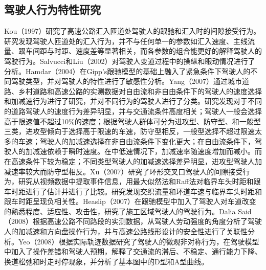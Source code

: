 \subsection{驾驶人行为特性研究}

Kou（1997）研究了高速公路汇入匝道处驾驶人的跟驰和汇入时的间隙接受行为。研究发现驾驶人匝道处的汇入行为，并不与任何单一的参数如汇入速度、主线流量、跟车间距与时距、速度差等显著相关，而各参数的组合能更好的解释驾驶人的驾驶行为\cite{Kou1997}。Salvucci和Liu（2002）对驾驶人变道过程中的操纵和眼动情况进行了分析\cite{Salvucci2002}。Hamdar（2004）在Gipp’s跟驰模型的基础上融入了紧急条件下驾驶人的不同驾驶类型，并对驾驶人的特性进行了敏感性分析\cite{Hamdar2004}。Yang（2007）通过城市道路、乡村道路和高速公路的实测数据对自由流和非自由条件下的驾驶人的速度选择和加减速行为进行了研究，并对不同行为的驾驶人进行了分类。研究发现对于不同的道路驾驶人的速度行为差异明显，并与交通流条件高度相关；驾驶人一般会选择高于限速值不超过10\%的速度；根据驾驶人群体可分为进攻型、防守型、和一般型三类，进攻型倾向于选择高于限速的车速，防守型相反，一般型选择不超过限速太多的车速；驾驶人的加减速选择在非自由流条件下变化更大；在自由流条件下，驾驶人的加减速依赖于瞬时速度。在中低速情况下，加减速率随速度增加而减小。而在高速条件下较为稳定；不同类型驾驶人的加减速选择差异明显，进攻型驾驶人加减速率较大而防守型相反\cite{Yang2008}。Xu（2007）研究了环形交叉口驾驶人的间隙接受行为，研究从视频数据中提取事件信息，用最大似然法和Raff法对临界车头时距和跟车时距进行了估计并进行了比较。研究发现交织流量和环道车速与临界车头时距和跟车时距呈现负相关性\cite{Xu2007}。Heaslip（2007）在跟驰模型中加入了驾驶人对车道改变的熟悉程度、适应性、攻击性，研究了施工区域驾驶人的驾驶行为\cite{Heaslip2007}。Dalia Said（2008）根据高速公路不同路段的实测数据，从驾驶人劳动强度的角度分析了驾驶人的加减速和方向盘操作行为，并与高速公路线形设计的安全性进行了关联性分析\cite{Said2008}。Yeo（2008）根据实际轨迹数据研究了驾驶人的微观非对称行为，在驾驶模型中加入了操作差错和驾驶人预期，解释了交通流的滞后、不稳定、通行能力下降、换道松弛和时走时停现象，并分析了基本图中的D型和A型曲线\cite{Yeo2008}。

